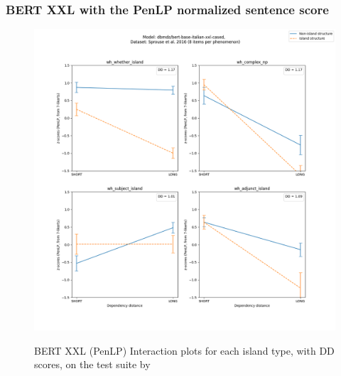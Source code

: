 \subsubsection{BERT XXL with the PenLP normalized sentence score}
\begin{figure}[h]
	\centering
	\includegraphics[width=1\textwidth]{images/AppendixA/Sprouse_wh_dbmdz_bert-base-italian-xxl-cased_PenLP-zscores-likert-2022-09-14_h17m26s15.png} 
	\label{A-fig:sprouse_bert_penlp}
	\caption{BERT XXL (PenLP) Interaction plots for each island type, with DD scores, on the test suite by \citet{sprouse2016experimental}}
\end{figure}
\clearpage
